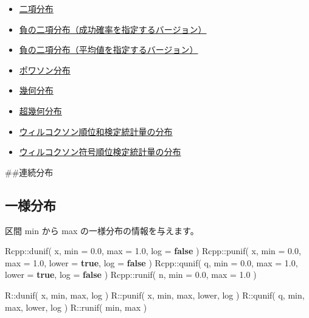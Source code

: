 \documentclass[]{book}
\newenvironment{Shaded}{\begin{snugshade}}{\end{snugshade}}
\newcommand{\FloatTok}[1]{\textcolor[rgb]{0.00,0.00,0.81}{#1}}
\newcommand{\KeywordTok}[1]{\textcolor[rgb]{0.13,0.29,0.53}{\textbf{#1}}}
\newcommand{\NormalTok}[1]{#1}
\providecommand{\tightlist}{%
  \setlength{\itemsep}{0pt}\setlength{\parskip}{0pt}}
\begin{document}
\begin{itemize}
\tightlist
\item
  \protect\hyperlink{ux4e8cux9805ux5206ux5e03}{二項分布}
\item
  \protect\hyperlink{ux8ca0ux306eux4e8cux9805ux5206ux5e03uxff08ux6210ux529fux78baux7387ux3092ux6307ux5b9aux3059ux308bux30d0ux30fcux30b8ux30e7ux30f3uxff09}{負の二項分布（成功確率を指定するバージョン）}
\item
  \protect\hyperlink{ux8ca0ux306eux4e8cux9805ux5206ux5e03uxff08ux5e73ux5747ux5024ux3092ux6307ux5b9aux3059ux308bux30d0ux30fcux30b8ux30e7ux30f3uxff09}{負の二項分布（平均値を指定するバージョン）}
\item
  \protect\hyperlink{ux30ddux30efux30bdux30f3ux5206ux5e03}{ポワソン分布}
\item
  \protect\hyperlink{ux5e7eux4f55ux5206ux5e03}{幾何分布}
\item
  \protect\hyperlink{ux8d85ux5e7eux4f55ux5206ux5e03}{超幾何分布}
\item
  \protect\hyperlink{ux30a6ux30a3ux30ebux30b3ux30afux30bdux30f3ux9806ux4f4dux548cux691cux5b9aux7d71ux8a08ux91cfux306eux5206ux5e03}{ウィルコクソン順位和検定統計量の分布}
\item
  \protect\hyperlink{ux30a6ux30a3ux30ebux30b3ux30afux30bdux30f3ux7b26ux53f7ux9806ux4f4dux691cux5b9aux7d71ux8a08ux91cfux306eux5206ux5e03}{ウィルコクソン符号順位検定統計量の分布}
\end{itemize}

\#\#連続分布

\subsection{一様分布}

区間 min から max の一様分布の情報を与えます。

\begin{Shaded}
\begin{Highlighting}[]
\NormalTok{Rcpp::dunif( x, min = }\FloatTok{0.0}\NormalTok{, max = }\FloatTok{1.0}\NormalTok{, log = }\KeywordTok{false}\NormalTok{ )}
\NormalTok{Rcpp::punif( x, min = }\FloatTok{0.0}\NormalTok{, max = }\FloatTok{1.0}\NormalTok{, lower = }\KeywordTok{true}\NormalTok{, log = }\KeywordTok{false}\NormalTok{ )}
\NormalTok{Rcpp::qunif( q, min = }\FloatTok{0.0}\NormalTok{, max = }\FloatTok{1.0}\NormalTok{, lower = }\KeywordTok{true}\NormalTok{, log = }\KeywordTok{false}\NormalTok{ )}
\NormalTok{Rcpp::runif( n, min = }\FloatTok{0.0}\NormalTok{, max = }\FloatTok{1.0}\NormalTok{ )}

\NormalTok{R::dunif( x, min, max,        log )}
\NormalTok{R::punif( x, min, max, lower, log )}
\NormalTok{R::qunif( q, min, max, lower, log )}
\NormalTok{R::runif(     min, max )}
\end{Highlighting}
\end{Shaded}
\end{document}
